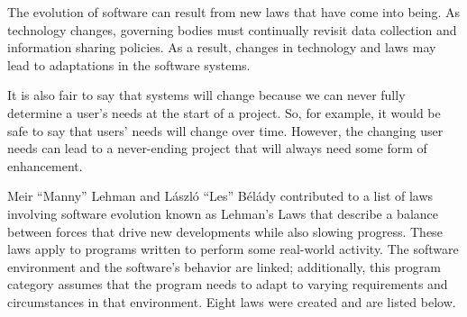 The evolution of software can result from new laws that have come into being. As technology changes, governing bodies must continually revisit data collection and information sharing policies. As a result, changes in technology and laws may lead to adaptations in the software systems.

It is also fair to say that systems will change because we can never fully determine a user's needs at the start of a project. So, for example, it would be safe to say that users' needs will change over time. However, the changing user needs can lead to a never-ending project that will always need some form of enhancement.

Meir ``Manny'' Lehman and László ``Les'' Bélády contributed to a list of laws involving software evolution known as Lehman's Laws that describe a balance between forces that drive new developments while also slowing progress. These laws apply to programs written to perform some real-world activity. The software environment and the software's behavior are linked; additionally, this program category assumes that the program needs to adapt to varying requirements and circumstances in that environment. Eight laws were created and are listed below. \cite{wiki:lehmans-laws}



